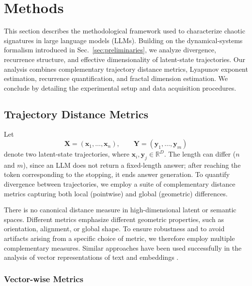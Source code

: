 \documentclass[aip%
 aip,
 amsmath,amssymb,
 reprint,%
]{revtex4-1}
\begin{document}
\section{Methods}
\label{sec:methods}

This section describes the methodological framework used to characterize chaotic signatures in large language models (LLMs). Building on the dynamical-systems formalism introduced in Sec.~\ref{sec:preliminaries}, we analyze divergence, recurrence structure, and effective dimensionality of latent-state trajectories. Our analysis combines complementary trajectory distance metrics, Lyapunov exponent estimation, recurrence quantification, and fractal dimension estimation. We conclude by detailing the experimental setup and data acquisition procedures.

\subsection{Trajectory Distance Metrics}
\label{subsec:trajectory_distance_metrics}

Let
\begin{equation}
\mathbf{X} = (\mathbf{x}_1,\dots,\mathbf{x}_n), \qquad
\mathbf{Y} = (\mathbf{y}_1,\dots,\mathbf{y}_m)
\end{equation}
denote two latent-state trajectories, where $\mathbf{x}_i,\mathbf{y}_j \in \mathbb{R}^D$. The length can differ ($n$ and $m$), since an LLM does not return a fixed-length answer; after reaching the token corresponding to the stopping, it ends answer generation. To quantify divergence between trajectories, we employ a suite of complementary distance metrics capturing both local (pointwise) and global (geometric) differences.

There is no canonical distance measure in high-dimensional latent or semantic spaces. Different metrics emphasize different geometric properties, such as orientation, alignment, or global shape. To ensure robustness and to avoid artifacts arising from a specific choice of metric, we therefore employ multiple complementary measures. Similar approaches have been used successfully in the analysis of vector representations of text and embeddings \cite{text2vec,reimers2019sentencebertsentenceembeddingsusing}.

\subsubsection{Vector-wise Metrics}
\label{sssec:methods_vector_metrics}
\end{document}
